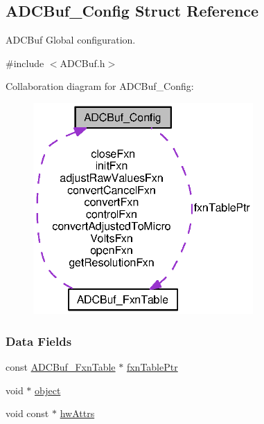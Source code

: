 \subsection{A\+D\+C\+Buf\+\_\+\+Config Struct Reference}
\label{struct_a_d_c_buf___config}


A\+D\+C\+Buf Global configuration.  




{\ttfamily \#include $<$A\+D\+C\+Buf.\+h$>$}



Collaboration diagram for A\+D\+C\+Buf\+\_\+\+Config\+:
\nopagebreak
\begin{figure}[H]
\begin{center}
\leavevmode
\includegraphics[width=238pt]{struct_a_d_c_buf___config__coll__graph}
\end{center}
\end{figure}
\subsubsection*{Data Fields}
\begin{DoxyCompactItemize}
\item 
const \hyperlink{struct_a_d_c_buf___fxn_table}{A\+D\+C\+Buf\+\_\+\+Fxn\+Table} $\ast$ \hyperlink{struct_a_d_c_buf___config_a473ad7e4d4c1d2ad9c4e96768447f6c7}{fxn\+Table\+Ptr}
\item 
void $\ast$ \hyperlink{struct_a_d_c_buf___config_a07b5e2c4dd87d3356c825f51aacb496a}{object}
\item 
void const $\ast$ \hyperlink{struct_a_d_c_buf___config_addb6e02b3b790b7123af2d7b7d1a1cf1}{hw\+Attrs}
\end{DoxyCompactItemize}


